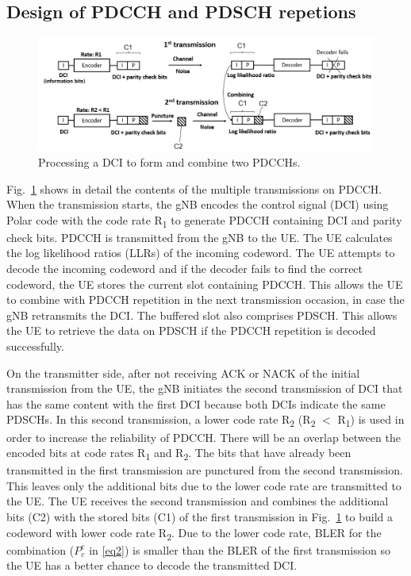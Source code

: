 \documentclass[conference]{IEEEtran}
\begin{document}
\subsection{Design of PDCCH and PDSCH repetions}\label{BB}
\begin{figure}[htbp]
\centerline{\includegraphics[scale=0.35]{fig3.png}}
\caption{Processing a DCI to form and combine two PDCCHs.}
\label{fig3}
\end{figure}

Fig.~\ref{fig3} shows in detail the contents of the multiple transmissions on PDCCH. When the transmission starts, the gNB encodes the control signal (DCI) using Polar code with the code rate R\textsubscript{1} to generate PDCCH containing DCI and parity check bits. PDCCH is transmitted from the gNB to the UE. The UE calculates the log likelihood ratios (LLRs) of the incoming codeword. The UE attempts to decode the incoming codeword and if the decoder fails to find the correct codeword, the UE stores the current slot containing PDCCH. This allows the UE to combine with PDCCH repetition in the next transmission occasion, in case the gNB retransmits the DCI. The buffered slot also comprises PDSCH. This allows the UE to retrieve the data on PDSCH if the PDCCH repetition is decoded successfully.

On the transmitter side, after not receiving ACK or NACK of the initial transmission from the UE, the gNB initiates the second transmission of DCI that has the same content with the first
DCI because both DCIs indicate the same PDSCHs. In this second transmission, a lower code rate R\textsubscript{2} (R\textsubscript{2} $<$ R\textsubscript{1}) is used in order to increase the reliability of PDCCH. There will be an overlap between the encoded bits at code rates R\textsubscript{1} and R\textsubscript{2}. The bits that have already been transmitted in the first transmission are punctured from the second transmission. This leaves only the additional bits due to the lower code rate are transmitted to the UE. The UE receives the second transmission and combines the additional bits (C2) with the stored bits (C1) of the first transmission in Fig.~\ref{fig3} to build a codeword with lower code rate R\textsubscript{2}. Due to the lower code rate, BLER for the combination ($P^{e}_{c}$ in \eqref{eq2}) is smaller than the BLER of the first transmission so the UE has a better chance to decode the transmitted DCI.
\end{document}
